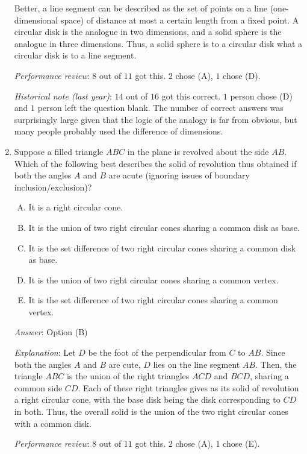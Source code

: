 \documentclass[10pt]{amsart}
\begin{document}
\begin{enumerate}
  Better, a line segment can be described as the set of points on a
  line (one-dimensional space) of distance at most a certain length
  from a fixed point. A circular disk is the analogue in two
  dimensions, and a solid sphere is the analogue in three
  dimensions. Thus, a solid sphere is to a circular disk what a
  circular disk is to a line segment.

  {\em Performance review}: $8$ out of $11$ got this. $2$ chose (A),
  $1$ chose (D).

  {\em Historical note (last year)}: $14$ out of $16$ got this
  correct. $1$ person chose (D) and $1$ person left the question
  blank. The number of correct answers was surprisingly large given
  that the logic of the analogy is far from obvious, but many people
  probably used the difference of dimensions.
\item Suppose a filled triangle $ABC$ in the plane is revolved about
  the side $AB$. Which of the following best describes the solid of
  revolution thus obtained if both the angles $A$ and $B$ are acute
  (ignoring issues of boundary inclusion/exclusion)?

  \begin{enumerate}[(A)]
  \item It is a right circular cone.
  \item It is the union of two right circular cones sharing a common
    disk as base.
  \item It is the set difference of two right circular cones sharing a
    common disk as base.
  \item It is the union of two right circular cones sharing a common
    vertex.
  \item It is the set difference of two right circular cones sharing a
    common vertex.
  \end{enumerate}

  {\em Answer}: Option (B)

  {\em Explanation}: Let $D$ be the foot of the perpendicular from $C$
  to $AB$. Since both the angles $A$ and $B$ are cute, $D$ lies on the
  line segment $AB$. Then, the triangle $ABC$ is the union of the
  right triangles $ACD$ and $BCD$, sharing a common side $CD$. Each of
  these right triangles gives as its solid of revolution a right
  circular cone, with the base disk being the disk corresponding to
  $CD$ in both. Thus, the overall solid is the union of the two right
  circular cones with a common disk.

  {\em Performance review}: $8$ out of $11$ got this. $2$ chose (A),
  $1$ chose (E).


\end{enumerate}
\end{document}
